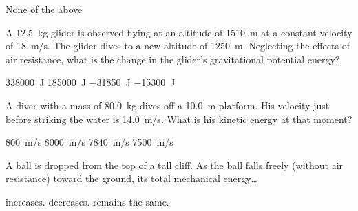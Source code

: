 \documentclass[../main-physics-problems.tex]{subfiles}
\begin{document}
\begin{questions}
\begin{center}
\end{center}

\begin{randomizechoices}[keeplast]
    \choice None of the above
\end{randomizechoices}



\question
A \SI{12.5}{kg} glider is observed flying at an altitude of \SI{1510}{m} at a constant velocity of \SI{18}{m/s}. The glider dives to a new altitude of \SI{1250}{m}. Neglecting the effects of air resistance, what is the change in the glider's gravitational potential energy?

\begin{randomizechoices}
\choice \SI{338000}{J}
\choice \SI{185000}{J}
\correctchoice \SI{-31850}{J}
\choice \SI{-15300}{J}
\end{randomizechoices}

\question
A diver with a mass of \SI{80.0}{kg} dives off a \SI{10.0}{m} platform. His velocity just before striking the water is \SI{14.0}{m/s}. What is his kinetic energy at that moment?

\begin{randomizechoices}
\choice \SI{800}{m/s}
\choice \SI{8000}{m/s}
\correctchoice \SI{7840}{m/s}
\choice \SI{7500}{m/s}
\end{randomizechoices}

\question
A ball is dropped from the top of a tall cliff. As the ball falls freely (without air resistance) toward the ground, its total mechanical energy\ldots 

\begin{randomizechoices}
\choice increases.
\choice decreases.
\correctchoice remains the same.
\end{randomizechoices}


\end{questions}
\end{document}
